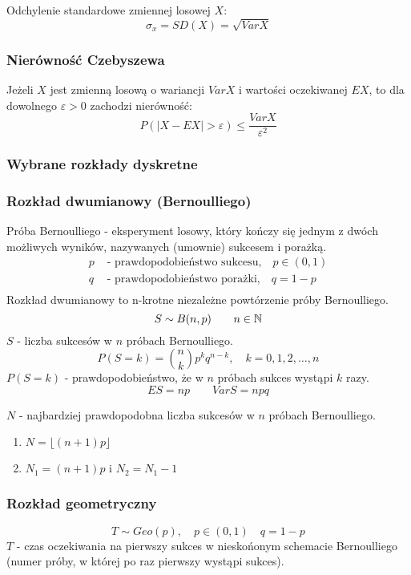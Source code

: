 \documentclass[../Matematyka.tex]{subfiles}
\begin{document}
Odchylenie standardowe zmiennej losowej \(X\):
\[\sigma_x = SD(X) = \sqrt{VarX}\]

\subsubsection*{Nierówność Czebyszewa}
Jeżeli \(X\) jest zmienną losową o wariancji \(VarX\) i wartości oczekiwanej \(EX\), to dla dowolnego \(\varepsilon > 0\) zachodzi nierówność:
\[P(|X - EX| > \varepsilon) \leq \frac{VarX}{\varepsilon^2}\]

\subsubsection{Wybrane rozkłady dyskretne}
\subsubsection*{Rozkład dwumianowy (Bernoulliego)}
Próba Bernoulliego - eksperyment losowy, który kończy się jednym z dwóch możliwych wyników, nazywanych (umownie) sukcesem i porażką.
\begin{align*}
    p & \text{ - prawdopodobieństwo sukcesu,} \quad p \in (0, 1) \\
    q & \text{ - prawdopodobieństwo porażki,} \quad q = 1 - p    \\
\end{align*}
Rozkład dwumianowy to n-krotne niezależne powtórzenie próby Bernoulliego.
\[S \sim B(n, p) \qquad n \in \mathbb{N}\]
\(S\) - liczba sukcesów w \(n\) próbach Bernoulliego.
\[P(S = k) = \binom{n}{k} p^k q^{n-k}, \quad k = 0, 1, 2, \ldots, n\]
\(P(S = k)\) - prawdopodobieństwo, że w \(n\) próbach sukces wystąpi \(k\) razy.
\[ES = np \qquad VarS = npq\]

\(N\) - najbardziej prawdopodobna liczba sukcesów w \(n\) próbach Bernoulliego.
\begin{enumerate}[label=(\roman*)]
    \item {} \(N = \lfloor (n+1)p \rfloor\)
    \item {} \(N_1 = (n+1)p \text{ i } N_2 = N_1 - 1\)
\end{enumerate}

\newpage
\subsubsection*{Rozkład geometryczny}
\[T \sim Geo(p), \quad p \in (0,1) \quad q = 1 - p\]
\(T\) - czas oczekiwania na pierwszy sukces w nieskońonym schemacie Bernoulliego (numer próby, w której po raz pierwszy wystąpi sukces).
\end{document}
